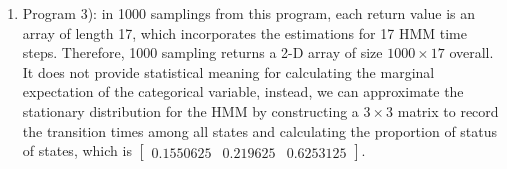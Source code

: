 \documentclass{article}
\begin{document}
\begin{enumerate}
\begin{enumerate}
\newpage
\item Program 3): in 1000 samplings from this program, each return value is an array of length 17,  which incorporates the estimations for 17 HMM time steps. Therefore, 1000 sampling returns a 2-D array of size $1000\times 17$ overall. \\
It does not provide statistical meaning for calculating the marginal expectation of the categorical variable, instead,  we can approximate the stationary distribution for the HMM by constructing a $3\times 3$ matrix to record the transition times among all states and calculating the proportion of status of states, which is $\begin{bmatrix}
0.1550625 & 0.219625 & 0.6253125
\end{bmatrix}$.
\begin{figure}[!htp]
	\centering
    \hfill%
   \hfill%
   \hfill%
        

\end{figure}
\end{enumerate}
\end{enumerate}
\end{document}
